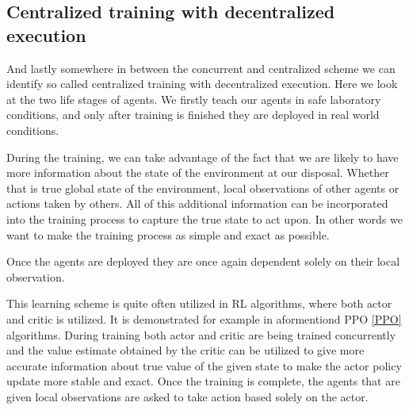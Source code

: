 \subsection*{Centralized training with decentralized execution}
And lastly somewhere in between the concurrent and centralized scheme we can identify so called centralized training with decentralized execution.
Here we look at the two life stages of agents. 
We firstly teach our agents in safe laboratory conditions, and only after training is finished they are deployed in real world conditions.

During the training, we can take advantage of the fact that we are likely to have more information about the state of the environment at our disposal.
Whether that is true global state of the environment, local observations of other agents or actions taken by others.
All of this additional information can be incorporated into the training process to capture the true state to act upon.
In other words we want to make the training process as simple and exact as possible.

Once the agents are deployed they are once again dependent solely on their local observation.

This learning scheme is quite often utilized in RL algorithms, where both actor and critic is utilized.
It is demonstrated for example in aformentiond PPO \ref{PPO} algorithms.
During training both actor and critic are being trained concurrently and the value estimate obtained by the critic can be utilized to give more accurate information about true value of the given state to make the actor policy update more stable and exact.
Once the training is complete, the agents that are given local observations are asked to take action based solely on the actor.

